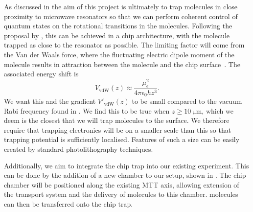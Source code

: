 As discussed in  the aim of this project is ultimately to
trap molecules in close proximity to microwave resonators so that we can
perform coherent control of quantum states on the rotational transitions in the
molecules.
%
Following the proposal by , this can be achieved in a chip
architecture, with the molecule trapped as close to the resonator as possible.
%
The limiting factor will come from the Van der Waals force, where the
fluctuating electric dipole moment of the molecule results in attraction
between the molecule and the chip surface~\cite{}. The associated energy
shift is 
%
\begin{equation}
  V_\text{vdW}(z) \approx \frac{\mu_e^2}{4\pi\epsilon_0 h z^3}.
\end{equation}
%
We want this and the gradient $V'_\text{vdW}(z)$ to be small compared to the
vacuum Rabi frequency found in . We find this to
be true when $z\geq\SI{10}{\micro\meter}$, which we deem is the closest that we
will trap molecules to the surface.  We therefore require that trapping
electronics will be on a smaller scale than this so that trapping potential is
sufficiently localised.  Features of such a size can be easily created by
standard photolithography techniques.

Additionally, we aim to integrate the chip trap into our existing \CaF{}
experiment. This can be done by the addition of a new chamber to our setup,
shown in . The chip chamber will be
positioned along the existing MTT axis, allowing extension of the transport
system and the delivery of molecules to this chamber. \CaF{} molecules can then
be transferred onto the chip trap.

